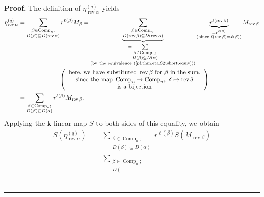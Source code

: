 \documentclass[numbers=enddot,12pt,final,onecolumn,notitlepage]{scrartcl}%
\theoremstyle{definition}
\newenvironment{proof}[1][Proof]{\noindent\textbf{#1.} }{\ \rule{0.5em}{0.5em}}
\let\sumnonlimits\sum
\renewcommand{\sum}{\sumnonlimits\limits}
\newenvironment{vershort}{}{}
\begin{document}
\begin{vershort}
\begin{proof}
The definition of $\eta_{\operatorname*{rev}\alpha}^{\left(  q\right)  }$
yields%
\begin{align*}
\eta_{\operatorname*{rev}\alpha}^{\left(  q\right)  }  &  =\sum
_{\substack{\beta\in\operatorname*{Comp}\nolimits_{n};\\D\left(  \beta\right)
\subseteq D\left(  \operatorname*{rev}\alpha\right)  }}r^{\ell\left(
\beta\right)  }M_{\beta}=\underbrace{\sum_{\substack{\beta\in
\operatorname*{Comp}\nolimits_{n};\\D\left(  \operatorname*{rev}\beta\right)
\subseteq D\left(  \operatorname*{rev}\alpha\right)  }}}_{\substack{=\sum
_{\substack{\beta\in\operatorname*{Comp}\nolimits_{n};\\D\left(  \beta\right)
\subseteq D\left(  \alpha\right)  }}\\\text{(by the equivalence
(\ref{pf.thm.eta.S2.short.equiv}))}}}\underbrace{r^{\ell\left(
\operatorname*{rev}\beta\right)  }}_{\substack{=r^{\ell\left(  \beta\right)
}\\\text{(since }\ell\left(  \operatorname*{rev}\beta\right)  =\ell\left(
\beta\right)  \text{)}}}M_{\operatorname*{rev}\beta}\\
&  \ \ \ \ \ \ \ \ \ \ \ \ \ \ \ \ \ \ \ \ \left(
\begin{array}
[c]{c}%
\text{here, we have substituted }\operatorname*{rev}\beta\text{ for }%
\beta\text{ in the sum,}\\
\text{since the map }\operatorname*{Comp}\nolimits_{n}\rightarrow
\operatorname*{Comp}\nolimits_{n},\ \delta\mapsto\operatorname*{rev}\delta\\
\text{is a bijection}%
\end{array}
\right) \\
&  =\sum_{\substack{\beta\in\operatorname*{Comp}\nolimits_{n};\\D\left(
\beta\right)  \subseteq D\left(  \alpha\right)  }}r^{\ell\left(  \beta\right)
}M_{\operatorname*{rev}\beta}.
\end{align*}
Applying the $\mathbf{k}$-linear map $S$ to both sides of this equality, we
obtain%
\begin{align*}
S\left(  \eta_{\operatorname*{rev}\alpha}^{\left(  q\right)  }\right)   &
=\sum_{\substack{\beta\in\operatorname*{Comp}\nolimits_{n};\\D\left(
\beta\right)  \subseteq D\left(  \alpha\right)  }}r^{\ell\left(  \beta\right)
}S\left(  M_{\operatorname*{rev}\beta}\right) \\
&  =\sum_{\substack{\beta\in\operatorname*{Comp}\nolimits_{n};\\D\left(
}}
\end{align*}
\end{proof}
\end{vershort}
\end{document}
